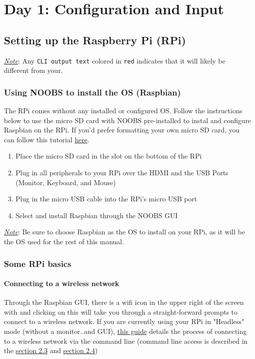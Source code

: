 \documentclass{article}
\newcommand{\outputi}[1]{\colorbox{light-gray}{\texttt{#1}}} %
\newcommand{\red}[1]{\textcolor{BrickRed}{#1}} %
\begin{document}
\section{Day 1: Configuration and Input}
\subsection{Setting up the Raspberry Pi (RPi)}
\underline{\textit{Note}}: Any \outputi{CLI output text} colored in \outputi{\red{red}} indicates that it will likely be different from your.
  \subsubsection{Using NOOBS to install the OS (Raspbian)}
  The RPi comes without any installed or configured OS. Follow the instructions below to use the micro SD card with NOOBS pre-installed to instal and configure Raspbian on the RPi. If you'd prefer formatting your own micro SD card, you can follow this tutorial \href{https://www.raspberrypi.org/help/noobs-setup/}{here}.
  \begin{enumerate}
    \item Place the micro SD card in the slot on the bottom of the RPi
    \item Plug in all peripherals to your RPi over the HDMI and the USB Ports (Monitor, Keyboard, and Mouse)
    \item Plug in the micro USB cable into the RPi's micro USB port
    \item Select and install Raspbian through the NOOBS GUI
  \end{enumerate}
  \underline{\textit{Note}}: Be sure to choose Raspbian as the OS to install on your RPi, as it will be the OS used for the rest of this manual.

  \subsubsection{Some RPi basics}
    \paragraph{Connecting to a wireless network}
    Through the Raspbian GUI, there is a wifi icon in the upper right of the screen with and clicking on this will take you through a straight-forward prompts to connect to a wireless network. If you are currently using your RPi in "Headless" mode (without a monitor..and GUI), \href{https://www.raspberrypi.org/documentation/configuration/wireless/wireless-cli.md}{this guide} details the process of connecting to a wireless network via the command line (command line access is described in the \hyperref[sec:connect-serial]{section 2.3} and \hyperref[sec:connect-ssh]{section 2.4})
\end{document}

